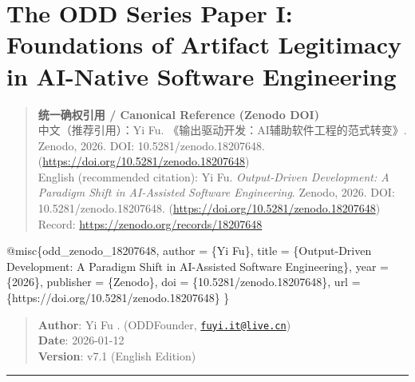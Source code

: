 \documentclass[
]{article}
\author{}
\date{}
\newenvironment{Shaded}{}{}
\newcommand{\DataTypeTok}[1]{\textcolor[rgb]{0.56,0.13,0.00}{#1}}
\newcommand{\NormalTok}[1]{#1}
\newcommand{\OtherTok}[1]{\textcolor[rgb]{0.00,0.44,0.13}{#1}}
\newcommand{\VariableTok}[1]{\textcolor[rgb]{0.10,0.09,0.49}{#1}}
\begin{document}
\hypertarget{the-odd-series-paper-i-foundations-of-artifact-legitimacy-in-ai-native-software-engineering}{%
\section{The ODD Series Paper I: Foundations of Artifact Legitimacy in
AI-Native Software
Engineering}\label{the-odd-series-paper-i-foundations-of-artifact-legitimacy-in-ai-native-software-engineering}}

\begin{quote}
\textbf{统一确权引用 / Canonical Reference (Zenodo DOI)}\\
中文（推荐引用）：Yi Fu. 《输出驱动开发：AI辅助软件工程的范式转变》.
Zenodo, 2026. DOI: 10.5281/zenodo.18207648.
(\url{https://doi.org/10.5281/zenodo.18207648})\\
English (recommended citation): Yi Fu. \emph{Output-Driven Development:
A Paradigm Shift in AI-Assisted Software Engineering}. Zenodo, 2026.
DOI: 10.5281/zenodo.18207648.
(\url{https://doi.org/10.5281/zenodo.18207648})\\
Record: \url{https://zenodo.org/records/18207648}
\end{quote}

\begin{Shaded}
\begin{Highlighting}[]
\VariableTok{@misc}\NormalTok{\{}\OtherTok{odd\_zenodo\_18207648}\NormalTok{,}
  \DataTypeTok{author}\NormalTok{    = \{Yi Fu\},}
  \DataTypeTok{title}\NormalTok{     = \{Output{-}Driven Development: A Paradigm Shift in AI{-}Assisted Software Engineering\},}
  \DataTypeTok{year}\NormalTok{      = \{2026\},}
  \DataTypeTok{publisher}\NormalTok{ = \{Zenodo\},}
  \DataTypeTok{doi}\NormalTok{       = \{10.5281/zenodo.18207648\},}
  \DataTypeTok{url}\NormalTok{       = \{https://doi.org/10.5281/zenodo.18207648\}}
\NormalTok{\}}
\end{Highlighting}
\end{Shaded}

\begin{quote}
\textbf{Author}: Yi Fu . (ODDFounder,
\href{mailto:fuyi.it@live.cn}{\nolinkurl{fuyi.it@live.cn}})\\
\textbf{Date}: 2026-01-12\\
\textbf{Version}: v7.1 (English Edition)
\end{quote}

\begin{center}\rule{0.5\linewidth}{0.5pt}\end{center}
\end{document}
